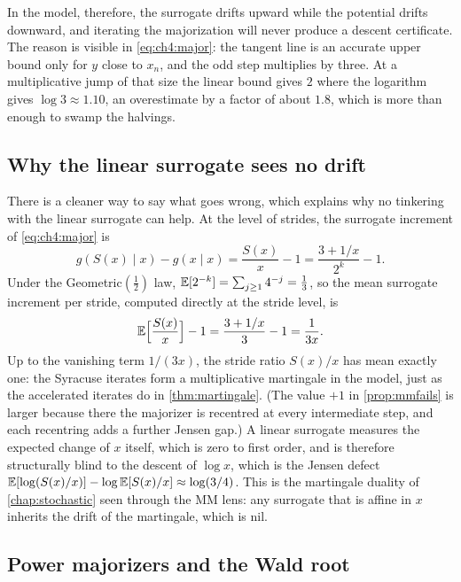 In the model, therefore, the surrogate drifts upward while the potential
drifts downward, and iterating the majorization will never produce a descent
certificate.  The reason is visible in \eqref{eq:ch4:major}: the tangent line
is an accurate upper bound only for $y$ close to $x_n$, and the odd step
multiplies by three.  At a multiplicative jump of that size the linear bound
gives $2$ where the logarithm gives $\log3\approx1.10$, an overestimate by a
factor of about $1.8$, which is more than enough to swamp the halvings.

\subsection{Why the linear surrogate sees no drift}

There is a cleaner way to say what goes wrong, which explains why no
tinkering with the linear surrogate can help.  At the level of strides, the
surrogate increment of \eqref{eq:ch4:major} is
\[
  g(S(x)\mid x)-g(x\mid x)=\frac{S(x)}{x}-1=\frac{3+1/x}{2^{k}}-1 .
\]
Under the Geometric$(\tfrac12)$ law, $\mathbb{E}[2^{-k}]=\sum_{j\ge1}4^{-j}=\tfrac13$,
so the mean surrogate increment per stride, computed directly at the stride
level, is
\begin{equation}\label{eq:ch4:martsurrogate}
  \mathbb{E}\Bigl[\frac{S(x)}{x}\Bigr]-1=\frac{3+1/x}{3}-1=\frac{1}{3x} .
\end{equation}
Up to the vanishing term $1/(3x)$, the stride ratio $S(x)/x$ has mean exactly
one: the Syracuse iterates form a multiplicative martingale in the model, just
as the accelerated iterates do in \cref{thm:martingale}.  (The value $+1$ in
\cref{prop:mmfails} is larger because there the majorizer is recentred at
every intermediate step, and each recentring adds a further Jensen gap.)  A
linear surrogate measures the expected change of $x$ itself, which is zero to
first order, and is therefore structurally blind to the descent of $\log x$,
which is the Jensen defect
$\mathbb{E}[\log(S(x)/x)]-\log\mathbb{E}[S(x)/x]\approx\log(3/4)$.  This is the martingale
duality of \cref{chap:stochastic} seen through the MM lens: any surrogate that
is affine in $x$ inherits the drift of the martingale, which is nil.

\subsection{Power majorizers and the Wald root}

